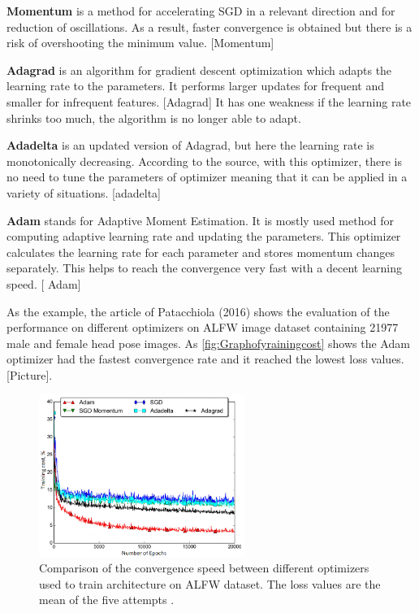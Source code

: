 \noindent
\textbf{Momentum} is a method for accelerating SGD in a relevant direction and for reduction of oscillations. As a result, faster convergence is obtained but there is a risk of overshooting the minimum value. [Momentum]

\noindent
\textbf{Adagrad} is an algorithm for gradient descent optimization which adapts the learning rate to the parameters. It performs larger updates for frequent and smaller for infrequent features. [Adagrad] It has one weakness if the learning rate shrinks too much, the algorithm is no longer able to adapt.

\noindent
\textbf{Adadelta} is an updated version of Adagrad, but here the learning rate is monotonically decreasing. According to the source, with this optimizer, there is no need to tune the parameters of optimizer meaning that it can be applied in a variety of situations. [adadelta]

\noindent
\textbf{Adam} stands for Adaptive Moment Estimation. It is mostly used method for computing adaptive learning rate and updating the parameters.  This optimizer calculates the learning rate for each parameter and stores momentum changes separately. This helps to reach the convergence very fast with a decent learning speed. [ Adam]

As the example, the article of Patacchiola (2016) shows the evaluation of the performance on different optimizers on ALFW image dataset containing 21977 male and female head pose images. As \autoref{fig:Graphofyrainingcost} shows the Adam optimizer had the fastest convergence rate and it reached the lowest loss values. [Picture]. 

\begin{figure} [H]
\centering
\includegraphics[width=0.6\textwidth]{figures/Graphofyrainingcost}
\caption{Comparison of the convergence speed between different optimizers used to train architecture on ALFW dataset. The loss values are the mean of the five attempts \citep{Acquarelli2017}.}
\label{fig:Graphofyrainingcost}  
\end{figure}

